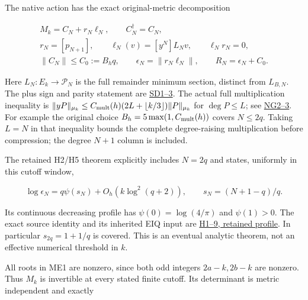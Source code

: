 \documentclass[11pt]{article}
\begin{document}
The native action has the exact original-metric decomposition

\[
\begin{gathered}
M_k=C_N+r_N\ell_N,\qquad C_N^{\dagger}=C_N,\\
r_N=[p_{N+1}],\qquad \ell_N(v)=[y^N]L_Nv,\qquad \ell_Nr_N=0,\\
\|C_N\|\le C_0:=B_hq,\qquad
\epsilon_N=\|r_N\ell_N\|,\qquad R_N=\epsilon_N+C_0.
\end{gathered}
\tag{ME4}
\]

Here \(L_N:E_k\to\mathcal P_N\) is the full remainder minimum section, distinct from \(L_{B,N}\). The plus sign and parity statement are \href{https://github.com/KokunoYumeto/zeta-function-research-reader/blob/5992ad50c0f2a06921f1fcaded7b4e38097c0739/workbenches/splitzero-tandem/continuations/20260920-original-kernel-mixed-determinants/providers/ORIGINAL_SPECTRAL_DETERMINANT.tex\#L34}{SD1--3}. The actual full multiplication inequality is \(\|yP\|_{\mu_k}\le C_{\rm mult}(h)(2L+\lfloor k/3\rfloor)\|P\|_{\mu_k}\) for \(\deg P\le L\); see \href{https://github.com/KokunoYumeto/zeta-function-research-reader/blob/5992ad50c0f2a06921f1fcaded7b4e38097c0739/workbenches/splitzero-tandem/continuations/20260920-original-kernel-mixed-determinants/providers/NATIVE_GAUSSIAN_TRANSFER.tex\#L50}{NG2--3}. For example the original choice \(B_h=5\max(1,C_{\rm mult}(h))\) covers \(N\le2q\). Taking \(L=N\) in that inequality bounds the complete degree-raising multiplication before compression; the degree \(N+1\) column is included.

The retained H2/H5 theorem explicitly includes \(N=2q\) and states, uniformly in this cutoff window,

\[
\log\epsilon_N=q\psi(s_N)+O_h(k\log^2(q+2)),\qquad
s_N=(N+1-q)/q.
\tag{ME5}
\]

Its continuous decreasing profile has \(\psi(0)=\log(4/\pi)\) and \(\psi(1)>0\). The exact source identity and its inherited EIQ input are \href{https://github.com/KokunoYumeto/zeta-function-research-reader/blob/edd4008690952fb8568a01744e49ad7e180401e9/workbenches/splitzero-tandem/continuations/20260921-original-observation/RETAINED_PROFILE_PROOF.tex\#L1}{H1--9, retained profile}. In particular \(s_{2q}=1+1/q\) is covered. This is an eventual analytic theorem, not an effective numerical threshold in \(k\).

All roots in ME1 are nonzero, since both odd integers \(2a-k,2b-k\) are nonzero. Thus \(M_k\) is invertible at every stated finite cutoff. Its determinant is metric independent and exactly
\end{document}
